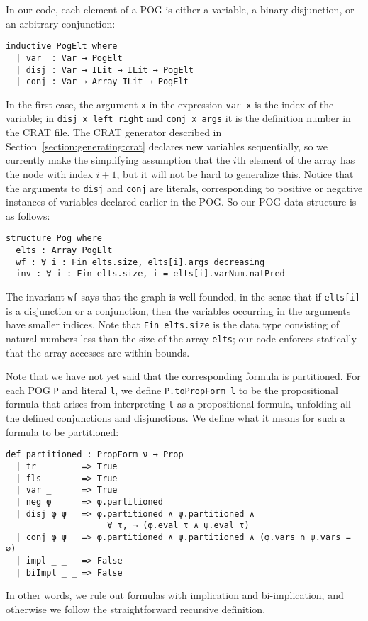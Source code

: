 In our code, each element of a POG  is either a variable, a binary disjunction,
or an arbitrary conjunction:
\begin{lstlisting}
inductive PogElt where
  | var  : Var → PogElt
  | disj : Var → ILit → ILit → PogElt
  | conj : Var → Array ILit → PogElt
\end{lstlisting}
In the first case, the argument \lstinline{x} in the expression
\lstinline{var x} is the index
of the variable; in \lstinline{disj x left right} and \lstinline{conj x args}
it is the definition number in the CRAT file.
The CRAT generator described in Section~\ref{section:generating:crat}
declares new variables sequentially, so we currently make the simplifying assumption
that the $i$th element of the array has the node with index $i + 1$,
but it will not be hard to generalize this.
Notice that the arguments to \lstinline{disj} and \lstinline{conj} are literals,
corresponding to positive or negative instances of variables declared earlier in the POG.
So our POG data structure is as follows:
\begin{lstlisting}
structure Pog where
  elts : Array PogElt
  wf : ∀ i : Fin elts.size, elts[i].args_decreasing
  inv : ∀ i : Fin elts.size, i = elts[i].varNum.natPred
\end{lstlisting}
The invariant \lstinline{wf} says that the graph is well founded, in the
sense that if \lstinline{elts[i]} is a disjunction
or a conjunction, then the variables occurring in the arguments have smaller indices.
Note that \lstinline{Fin elts.size} is the data type consisting of natural numbers
less than the size of the array \lstinline{elts}; our code enforces statically
that the array accesses are within bounds.

Note that we have not yet said that the corresponding formula is partitioned.
For each POG \lstinline{P} and literal \lstinline{l}, we define
\lstinline{P.toPropForm l} to be the
propositional formula that arises from interpreting \lstinline{l} as a propositional
formula, unfolding all the defined conjunctions and disjunctions. We define
what it means for such a formula to be partitioned:
\begin{lstlisting}
def partitioned : PropForm ν → Prop
  | tr         => True
  | fls        => True
  | var _      => True
  | neg φ      => φ.partitioned
  | disj φ ψ   => φ.partitioned ∧ ψ.partitioned ∧
                    ∀ τ, ¬ (φ.eval τ ∧ ψ.eval τ)
  | conj φ ψ   => φ.partitioned ∧ ψ.partitioned ∧ (φ.vars ∩ ψ.vars = ∅)
  | impl _ _   => False
  | biImpl _ _ => False
\end{lstlisting}
In other words, we rule out formulas with implication and bi-implication, and otherwise
we follow the straightforward recursive definition.

